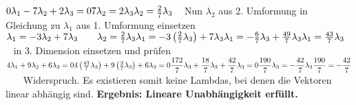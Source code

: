 \documentclass[10pt,ngerman]{scrartcl}
\begin{document}
\begin{enumerate}[1.]
\begin{enumerate}[(a)]
	\begin{math}
	0 \lambda _1 - 7 \lambda _2 + 2 \lambda _3 = 0 \newline
    7 \lambda _2 = 2 \lambda _3 \newline
    \lambda _2 = \frac{2}{7} \lambda _3 
    \end{math}
	\newline ~ \newline
	Nun $\lambda _2 $ aus 2. Umformung in Gleichung zu $\lambda _1 $ aus 1. Umformung einsetzen\newline
	\begin{math}
	\lambda _1 = -3 \lambda _2 + 7 \lambda _3 ~~~~~~   \lambda _2 = \frac{2}{7} \lambda _3 \newline
	\lambda _1 = -3 \left (\frac{2}{7} \lambda _3\right ) + 7 \lambda _3\newline
	\lambda _1 = -\frac{6}{7} \lambda _3 + \frac{49}{7} \lambda _3\newline
	\lambda _1 = \frac{43}{7} \lambda _3
    \end{math}
	\newline ~ \newline
	in 3. Dimension einsetzen und prüfen\newline
	\begin{math}
	4 \lambda _1 + 9 \lambda _2 + 6 \lambda _3 = 0 \newline
	4 \left(\frac{43}{7} \lambda _3\right) + 9 \left(\frac{2}{7} \lambda _3 \right) + 6 \lambda _3 = 0 \newline
	\dfrac{172}{7} \lambda _3 + \dfrac{18}{7} \lambda _3 + \dfrac{42}{7} \lambda _3 = 0 \newline
	\dfrac{190}{7} \lambda _3  = - \dfrac{42}{7} \lambda _3 \newline
	~\newline
	\dfrac{190}{7} = - \dfrac{42}{7} \end{math} ~~~ Widerspruch. Es existieren somit keine Lambdas, bei denen die Vektoren linear abhängig sind.\newline
	\textbf{Ergebnis: Lineare Unabhängigkeit erfüllt.}\newline~\newline
	
	~\newline
	

\end{enumerate}
\end{enumerate}
\end{document}
